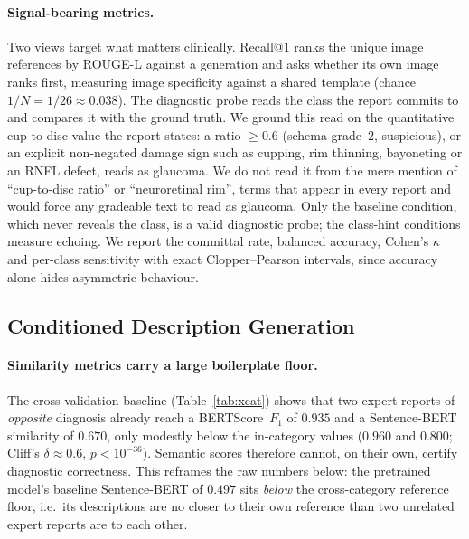 \documentclass[runningheads]{llncs}
\begin{document}
\paragraph{Signal-bearing metrics.}
Two views target what matters clinically. Recall@1 ranks the unique image references by ROUGE-L against a generation and asks whether its own image ranks first, measuring image specificity against a shared template (chance $1/N=1/26\approx0.038$). The diagnostic probe reads the class the report commits to and compares it with the ground truth. We ground this read on the quantitative cup-to-disc value the report states: a ratio $\geq0.6$ (schema grade~2, suspicious), or an explicit non-negated damage sign such as cupping, rim thinning, bayoneting or an RNFL defect, reads as glaucoma. We do not read it from the mere mention of ``cup-to-disc ratio'' or ``neuroretinal rim'', terms that appear in every report and would force any gradeable text to read as glaucoma. Only the baseline condition, which never reveals the class, is a valid diagnostic probe; the class-hint conditions measure echoing. We report the committal rate, balanced accuracy, Cohen's $\kappa$ and per-class sensitivity with exact Clopper--Pearson intervals, since accuracy alone hides asymmetric behaviour.




\subsection{Conditioned Description Generation}
\label{sec:results-conditioning}

\paragraph{Similarity metrics carry a large boilerplate floor.}
The cross-validation baseline (Table~\ref{tab:xcat}) shows that two expert reports
of \emph{opposite} diagnosis already reach a BERTScore~$F_1$ of $0.935$ and a
Sentence-BERT similarity of $0.670$, only modestly below the in-category values
($0.960$ and $0.800$; Cliff's $\delta\approx0.6$, $p<10^{-36}$). Semantic scores
therefore cannot, on their own, certify diagnostic correctness. This reframes the
raw numbers below: the pretrained model's baseline Sentence-BERT of $0.497$ sits
\emph{below} the cross-category reference floor, i.e.\ its descriptions are no
closer to their own reference than two unrelated expert reports are to each other.
\end{document}
